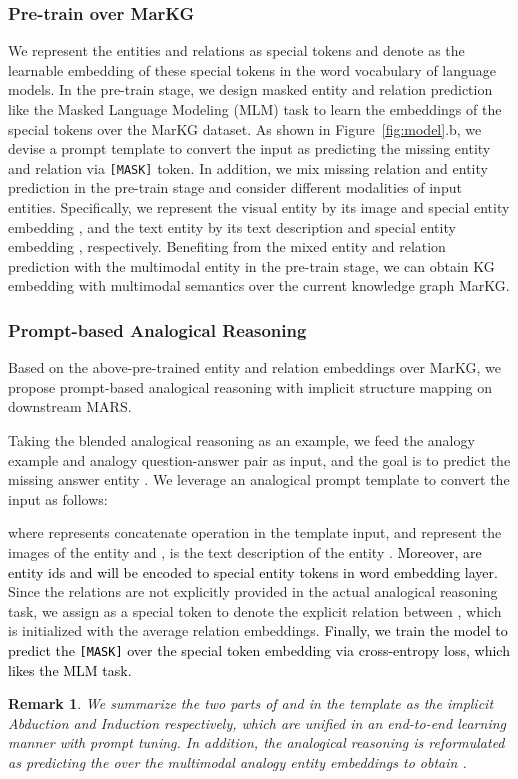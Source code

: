 \documentclass{article} \usepackage{iclr2023_conference,times}
\newtheorem{remark}{\noindent \textbf{Remark}}
\newcommand{\data}{MARS}
\newcommand{\kg}{MarKG}
\begin{document}
\subsubsection{Pre-train over MarKG}
\label{sec:pre-train}
We represent the entities  and relations  as special tokens and denote  as the learnable embedding of these special tokens in the word vocabulary of language models.
In the pre-train stage, we design masked entity and relation prediction like the Masked Language Modeling (MLM) task to learn the embeddings of the special tokens over the {\kg} dataset.
As shown in Figure~\ref{fig:model}.b, we devise a prompt template to convert the input as predicting the missing entity and relation via \texttt{[MASK]} token.
In addition, we mix missing relation and entity prediction in the pre-train stage and consider different modalities of input entities.
Specifically, we represent the visual entity  by its image  and special entity embedding , and the text entity  by its text description  and special entity embedding  , respectively. 
Benefiting from the mixed entity and relation prediction with the multimodal entity in the pre-train stage, we can obtain KG embedding with multimodal semantics over the current knowledge graph \kg.

\subsubsection{Prompt-based Analogical Reasoning}

Based on the above-pre-trained entity and relation embeddings over \kg, we propose prompt-based analogical reasoning with implicit structure mapping on downstream \data. 


Taking the blended analogical reasoning as an example, we feed the analogy example  and analogy question-answer pair  as input, and the goal is to predict the missing answer entity .
We leverage an analogical prompt template to convert the input as  follows:

where  represents concatenate operation in the template input,  and  represent the images of the entity  and ,  is the text description of the entity . \textcolor{black}{Moreover,  are entity ids and will be encoded to special entity tokens  in word embedding layer.}
Since the relations are not explicitly provided in the actual analogical reasoning task, we assign  as a special token to denote the explicit relation between , which is initialized with the average relation embeddings.
\textcolor{black}{
Finally, we train the model to predict the \texttt{[MASK]} over the special token embedding  via cross-entropy loss, which likes the MLM task.
}
\begin{remark}
We summarize the two parts of  and  in the template as the implicit \textit{Abduction} and  \textit{Induction} respectively, which are unified in an end-to-end learning manner with prompt tuning.
In addition, the analogical reasoning is reformulated as predicting the  over the multimodal analogy entity embeddings to obtain .
\end{remark}
\end{document}
